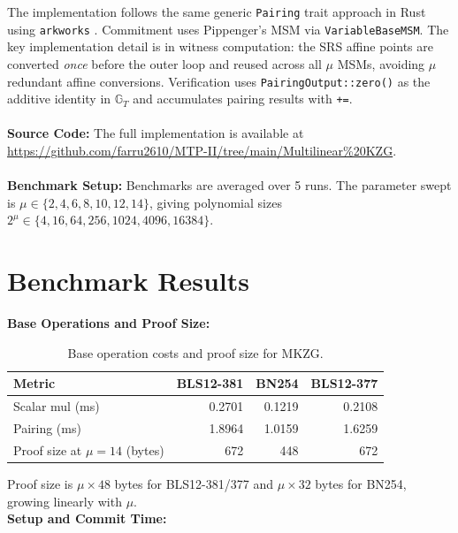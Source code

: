 The implementation follows the same generic \texttt{Pairing} trait
approach in Rust using \texttt{arkworks} \cite{arkworks}. Commitment
uses Pippenger's MSM via \texttt{VariableBaseMSM}. The key
implementation detail is in witness computation: the SRS affine
points are converted \emph{once} before the outer loop and reused
across all $\mu$ MSMs, avoiding $\mu$ redundant affine conversions.
Verification uses \texttt{PairingOutput::zero()} as the additive
identity in $\mathbb{G}_T$ and accumulates pairing results with
\texttt{+=}.
\\\\
\textbf{Source Code:}
The full implementation is available at
\url{https://github.com/farru2610/MTP-II/tree/main/Multilinear%20KZG}.
\\\\
\textbf{Benchmark Setup:}
Benchmarks are averaged over 5 runs. The parameter swept is
$\mu \in \{2, 4, 6, 8, 10, 12, 14\}$, giving polynomial sizes
$2^\mu \in \{4, 16, 64, 256, 1024, 4096, 16384\}$.

\section{Benchmark Results}

\textbf{Base Operations and Proof Size:}

\begin{table}[H]
\centering
\caption{Base operation costs and proof size for MKZG.}
\label{tab:mkzg-base}
\begin{tabular}{lrrr}
\toprule
\textbf{Metric} & \textbf{BLS12-381} & \textbf{BN254} & \textbf{BLS12-377} \\
\midrule
Scalar mul (ms)              & 0.2701 & 0.1219 & 0.2108 \\
Pairing (ms)                 & 1.8964 & 1.0159 & 1.6259 \\
Proof size at $\mu=14$ (bytes) & 672  & 448    & 672    \\
\bottomrule
\end{tabular}
\end{table}

Proof size is $\mu \times 48$ bytes for BLS12-381/377 and
$\mu \times 32$ bytes for BN254, growing linearly with $\mu$.
\\
\textbf{Setup and Commit Time:}

